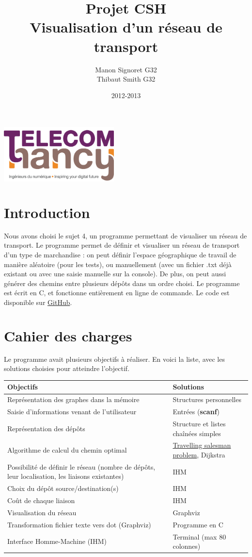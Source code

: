 \documentclass[12pt,a4paper]{report}
\date{2012-2013}
\author{Manon Signoret G32\\Thibaut Smith G32}
\title{Projet CSH\\Visualisation d'un r\'{e}seau de transport}
\makeatletter
\def\maketitle{
  \null
  \begin{flushleft}
   \includegraphics[width=6cm]{telecom_nancy.png}
  \end{flushleft}
  \vfill
  \begin{center}\leavevmode
    \normalfont
    {\LARGE \@title\par}
    {\Large \@date\par} 
    \vskip 1cm
    
  \end{center}
  \vfill
  \hfill
  \begin{flushright}
    {\Large \@author\par}
  \end{flushright}
  \cleardoublepage
  }
\makeatother
\begin{document}
\thispagestyle{empty}
\maketitle
\pagebreak

\section{Introduction}
Nous avons choisi le sujet 4, un programme permettant de visualiser un r\'{e}seau de transport. Le programme permet de d\'{e}finir et visualiser un r\'{e}seau de transport d'un type de marchandise : on peut d\'{e}finir l'espace g\'{e}ographique de travail de mani\`{e}re al\'{e}atoire (pour les tests), ou manuellement (avec un fichier .txt déjà existant ou avec une saisie manuelle sur la console). De plus, on peut aussi g\'{e}n\'{e}rer des chemins entre plusieurs d\'{e}pôts dans un ordre choisi. Le programme est \'{e}crit en C, et fonctionne enti\`{e}rement en ligne de commande. Le code est disponible sur \href{https://github.com/Videl/Graph-Visualization-Manager}{GitHub}.


\section{Cahier des charges}
Le programme avait plusieurs objectifs \`{a} r\'{e}aliser. En voici la liste, avec les solutions choisies pour atteindre l'objectif.

\begin{center}
  \begin{tabular}{|m{7cm}|m{7cm}|}
    \hline
    \textbf{Objectifs} & \textbf{Solutions} \\
    \hline
    Repr\'{e}sentation des graphes dans la m\'{e}moire       & Structures personnelles \\
    \hline
    Saisie d'informations venant de l'utilisateur    & Entr\'{e}es (\textbf{scanf}) \\
    \hline
    Repr\'{e}sentation des d\'{e}pôts                        & Structure et listes cha\^in\'{e}es simples \\
    \hline
    Algorithme de calcul du chemin optimal           & \href{https://en.wikipedia.org/wiki/Travelling_salesman_problem}{Travelling salesman problem}, Dijkstra \\
    \hline
    Possibilit\'{e} de d\'{e}finir le r\'{e}seau (nombre de d\'{e}p\^ots, leur localisation, les liaisons existantes)			     &	IHM \\
    \hline
    Choix du d\'{e}p\^ot source/destination(s)			 & IHM \\
    \hline
    Co\^ut de chaque liaison						 & IHM \\
    \hline
  	Visualisation du r\'{e}seau							 & Graphviz \\
    \hline
    Transformation fichier texte vers dot (Graphviz)     & Programme en C \\
    \hline
    Interface Homme-Machine (IHM)                    & Terminal (max 80 colonnes) \\
    \hline
    
  \end{tabular}
\end{center}
\end{document}
